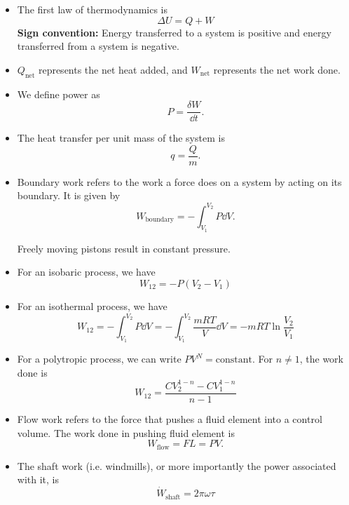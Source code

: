 \begin{itemize}
    \item The first law of thermodynamics is
          \begin{equation}
              \Delta U = Q + W
          \end{equation}
          \textbf{Sign convention:} Energy transferred to a system is positive and energy transferred from a system is negative.
    \item $Q_\text{net}$ represents the net heat added, and $W_\text{net}$ represents the net work done.
    \item We define power as
          \begin{equation}
              P = \frac{\delta W}{\dd{t}}.
          \end{equation}
    \item The heat transfer per unit mass of the system is
          \begin{equation}
              q = \frac{Q}{m}.
          \end{equation}
    \item Boundary work refers to the work a force does on a system by acting on its boundary. It is given by
          \begin{equation}
              W_\text{boundary} = -\int_{V_1}^{V_2}P\dd{V}.
          \end{equation}
          \begin{idea}
              Freely moving pistons result in constant pressure.
          \end{idea}
    \item For an isobaric process, we have
          \begin{equation}
              W_{12} = -P(V_2-V_1)
          \end{equation}
    \item For an isothermal process, we have
          \begin{equation}
              W_{12}  =-\int_{V_1}^{V_2} P \dd{V}  = -\int_{V_1}^{V_2} \frac{mRT}{V}\dd{V} =  -mRT \ln\frac{V_2}{V_1}
          \end{equation}
    \item For a polytropic process, we can write $PV^N = \text{constant}$. For $n\neq 1$, the work done is
          \begin{equation}
              W_{12} = \frac{CV_{2}^{1-n}-CV_1^{1-n}}{n-1}
          \end{equation}
    \item Flow work refers to the force that pushes a fluid element into a control volume. The work done in pushing fluid element is
          \begin{equation}
              W_\text{flow} = FL = PV.
          \end{equation}
    \item The shaft work (i.e. windmills), or more importantly the power associated with it, is
          \begin{equation}
              \dot{W}_\text{shaft} = 2\pi\omega\tau
          \end{equation}

\end{itemize}
